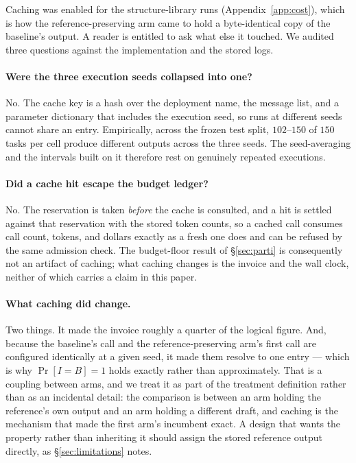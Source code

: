 \documentclass{article}
\begin{document}
Caching was enabled for the structure-library runs (Appendix~\ref{app:cost}),
which is how the reference-preserving arm came to hold a byte-identical copy of
the baseline's output. A reader is entitled to ask what else it touched. We
audited three questions against the implementation and the stored logs.

\paragraph{Were the three execution seeds collapsed into one?} No. The cache key
is a hash over the deployment name, the message list, and a parameter dictionary
that includes the execution seed, so runs at different seeds cannot share an
entry. Empirically, across the frozen test split, $102$--$150$ of $150$ tasks
per cell produce different outputs across the three seeds. The seed-averaging
and the intervals built on it therefore rest on genuinely repeated executions.

\paragraph{Did a cache hit escape the budget ledger?} No. The reservation is
taken \emph{before} the cache is consulted, and a hit is settled against that
reservation with the stored token counts, so a cached call consumes call count,
tokens, and dollars exactly as a fresh one does and can be refused by the same
admission check. The budget-floor result of \S\ref{sec:parti} is consequently
not an artifact of caching; what caching changes is the invoice and the wall
clock, neither of which carries a claim in this paper.

\paragraph{What caching did change.} Two things. It made the invoice roughly a
quarter of the logical figure. And, because the baseline's call and the
reference-preserving arm's first call are configured identically at a given
seed, it made them resolve to one entry --- which is why $\Pr[I{=}B]=1$ holds
exactly rather than approximately. That is a coupling between arms, and we
treat it as part of the treatment definition rather than as an incidental
detail: the comparison is between an arm holding the reference's own output and
an arm holding a different draft, and caching is the mechanism that made the
first arm's incumbent exact. A design that wants the property rather than
inheriting it should assign the stored reference output directly, as
\S\ref{sec:limitations} notes.
\end{document}
